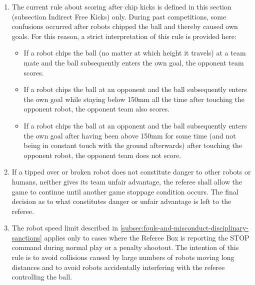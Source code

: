 \begin{enumerate}
\item
The current rule about scoring after chip kicks is defined in this section (subsection Indirect Free Kicks) only.
During past competitions, some confusions occurred after robots chipped the ball and thereby caused own goals.
For this reason, a strict interpretation of this rule is provided here:
\begin{itemize}
\item If a robot chips the ball (no matter at which height it travels) at a team mate and the ball subsequently enters the own goal, the opponent team scores.
\item If a robot chips the ball at an opponent and the ball subsequently enters the own goal while staying below 150mm all the time after touching the opponent robot, the opponent team also scores.
\item If a robot chips the ball at an opponent and the ball subsequently enters the own goal after having been above 150mm for some time (and not being in constant touch with the ground afterwards) after touching the opponent robot, the opponent team does not score.
\end{itemize}
\item
If a tipped over or broken robot does not constitute danger to other robots or humans, neither gives its team unfair advantage, the referee shall allow the game to continue until another game stoppage condition occurs.
The final decision as to what constitutes danger or unfair advantage is left to the referee.

\item
The robot speed limit described in \autoref{subsec:fouls-and-misconduct-disciplinary-sanctions} applies only to cases where the Referee Box is reporting the STOP command during normal play or a penalty shootout.
The intention of this rule is to avoid collisions caused by large numbers of robots moving long distances and to avoid robots accidentally interfering with the referee controlling the ball.

\end{enumerate}
